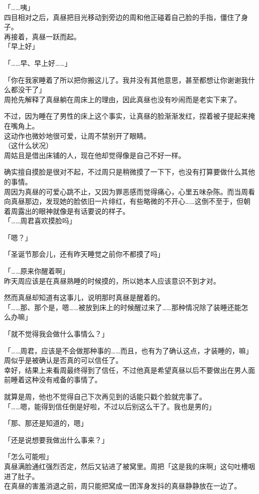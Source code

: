 「……咦」\\

四目相对之后，真昼把目光移动到旁边的周和他正碰着自己脸的手指，僵住了身子。\\

再接着，真昼一跃而起。\\

「早上好」

「……早、早上好……」

「你在我家睡着了所以把你搬这儿了。我并没有其他意思，甚至都想让你谢谢我什么都没干了」\\

周抢先解释了真昼躺在周床上的理由，因此真昼也没有吵闹而是老实下来了。

不过，因为睡在了男性的床上这个事实，让真昼的脸渐渐发红，捏着被子提起来掩在嘴角上。\\

这动作也微妙地很可爱，让周不禁别开了眼睛。\\

（这什么状况）\\

周姑且是借出床铺的人，现在他却觉得像是自己不好一样。

确实擅自摸脸是很对不起，不过周只是稍微摸了一下下，也没有打算要做什么其他的事情。\\

周因为真昼的可爱心跳不止，又因为罪恶感而觉得痛心，心里五味杂陈。而当周看向真昼那边，发现她的脸依旧一片绯红，有些略微的不开心……这倒不至于，但朝着周露出的眼神就像是有话要说的样子。\\

「……周君喜欢摸脸吗」

「嗯？」

「圣诞节那会儿，还有昨天睡觉之前你不都摸了吗」

「……原来你醒着啊」\\

昨天周应该是在真昼熟睡的时候摸的，所以她本人应该意识不到才对。

然而真昼却知道有这事儿，说明那时真昼是醒着的。\\

「……那、那个是，嗯……被放到床上的时候醒过来了……那种情况除了装睡还能怎么办嘛」

「就不觉得我会做什么事情么？」

「……周君，应该是不会做那种事的……而且，也有为了确认这点，才装睡的，嘛」\\

周似乎是被确认是否真的可以信任了。\\

幸好，结果上来看周最终得到了信任，不过他真是希望真昼以后不要做出在男人面前睡着这种没有戒备的事情了。

就算是周，他也不觉得自己下次再见到的话能只戳个脸就完事了。\\

「……嗯，能得到信任倒是好啦，不过以后别这么干了。我也是男的」

「那、那还是知道的，嗯」

「还是说想要我做出什么事来？」

「怎么可能啦」\\

真昼满脸通红强烈否定，然后又钻进了被窝里。周把「这是我的床啊」这句吐槽咽进了肚子。\\

在真昼的害羞消退之前，周只能把窝成一团浑身发抖的真昼静静放在一边了。

